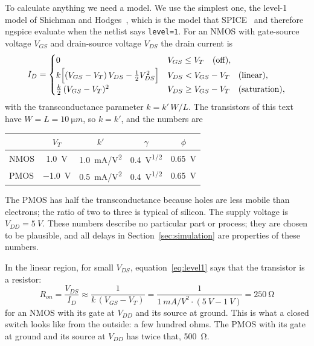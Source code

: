 \documentclass[11pt,a4paper]{article}
\newcommand{\VDD}{V_{DD}}
\newcommand{\VT}{V_{T}}
\begin{document}
To calculate anything we need a model. We use the simplest one, the
level-1 model of Shichman and Hodges~\cite{Shichman1968}, which is the
model that SPICE~\cite{Nagel1973} and therefore ngspice evaluate when
the netlist says \texttt{level=1}. For an NMOS with gate-source voltage
$V_{GS}$ and drain-source voltage $V_{DS}$ the drain current is
\begin{equation}
    I_D = \begin{cases}
        0 & V_{GS}\le\VT \quad\text{(off)},\\[2pt]
        k\Bigl[(V_{GS}-\VT)\,V_{DS} - \tfrac12 V_{DS}^2\Bigr]
            & V_{DS} < V_{GS}-\VT \quad\text{(linear)},\\[2pt]
        \tfrac{k}{2}\,(V_{GS}-\VT)^2
            & V_{DS}\ge V_{GS}-\VT \quad\text{(saturation)},
    \end{cases}
    \label{eq:level1}
\end{equation}
with the transconductance parameter $k = k'\,W/L$. The transistors of
this text have $W=L=\SI{10}{\micro m}$, so $k=k'$, and the numbers are
\begin{center}
\begin{tabular}{lcccc}
\toprule
 & $\VT$ & $k'$ & $\gamma$ & $\phi$ \\
\midrule
NMOS & \SI{1.0}{V} & \SI{1.0}{mA/V^2} & \SI{0.4}{V^{1/2}} & \SI{0.65}{V} \\
PMOS & \SI{-1.0}{V} & \SI{0.5}{mA/V^2} & \SI{0.4}{V^{1/2}} & \SI{0.65}{V} \\
\bottomrule
\end{tabular}
\end{center}
The PMOS has half the transconductance because holes are less mobile
than electrons; the ratio of two to three is typical of silicon. The
supply voltage is $\VDD=\SI{5}{V}$. These numbers describe no
particular part or process; they are chosen to be plausible, and all
delays in Section~\ref{sec:simulation} are properties of these numbers.

In the linear region, for small $V_{DS}$, equation~\eqref{eq:level1}
says that the transistor is a resistor:
\begin{equation}
    R_{on} = \frac{V_{DS}}{I_D} \approx \frac{1}{k\,(V_{GS}-\VT)}
           = \frac{1}{\SI{1}{mA/V^2}\cdot(\SI{5}{V}-\SI{1}{V})}
           = \SI{250}{\ohm}
    \label{eq:ron}
\end{equation}
for an NMOS with its gate at $\VDD$ and its source at ground. This is
what a closed switch looks like from the outside: a few hundred ohms.
The PMOS with its gate at ground and its source at $\VDD$ has twice that,
\SI{500}{\ohm}.
\end{document}
